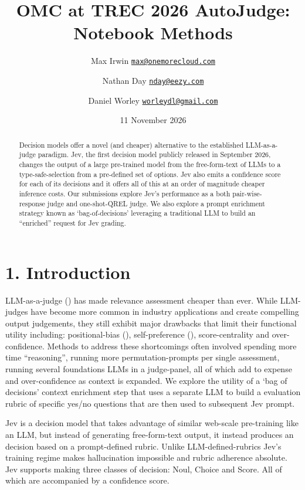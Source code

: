\documentclass[
  10pt,
]{article}
\title{OMC at TREC 2026 AutoJudge: Notebook Methods}
\author{Max Irwin
\href{mailto:max@onemorecloud.com}{\nolinkurl{max@onemorecloud.com}} \and Nathan
Day \href{mailto:nday@eezy.com}{\nolinkurl{nday@eezy.com}} \and Daniel
Worley \href{mailto:worleydl@gmail.com}{\nolinkurl{worleydl@gmail.com}}}
\date{11 November 2026}
\begin{document}
\maketitle
\begin{abstract}
Decision models offer a novel (and cheaper) alternative to the
established LLM-as-a-judge paradigm. Jev, the first decision model
publicly released in September 2026, changes the output of a large
pre-trained model from the free-form-text of LLMs to a
type-safe-selection from a pre-defined set of options. Jev also emits a
confidence score for each of its decisions and it offers all of this at
an order of magnitude cheaper inference costs. Our submissions explore
Jev's performance as a both pair-wise-response judge and one-shot-QREL
judge. We also explore a prompt enrichment strategy known as
`bag-of-decisions' leveraging a traditional LLM to build an ``enriched''
request for Jev grading.
\end{abstract}

\section{1. Introduction}\label{introduction}

LLM-as-a-judge () has
made relevance assessment cheaper than ever. While LLM-judges have
become more common in industry applications and create compelling output
judgements, they still exhibit major drawbacks that limit their
functional utility including: positional-bias
(), self-preference
(),
score-centrality and over-confidence. Methods to address these
shortcomings often involved spending more time ``reasoning'', running
more permutation-prompts per single assessment, running several
foundations LLMs in a judge-panel, all of which add to expense and
over-confidence as context is expanded. We explore the utility of a `bag
of decisions' context enrichment step that uses a separate LLM to build
a evaluation rubric of specific yes/no questions that are then used to
subsequent Jev prompt.

Jev is a decision model that takes advantage of similar web-scale
pre-training like an LLM, but instead of generating free-form-text
output, it instead produces an decision based on a prompt-defined
rubric. Unlike LLM-defined-rubrics Jev's training regime makes
hallucination impossible and rubric adherence absolute. Jev supports
making three classes of decision: Noul, Choice and Score. All of which
are accompanied by a confidence score.
\end{document}
